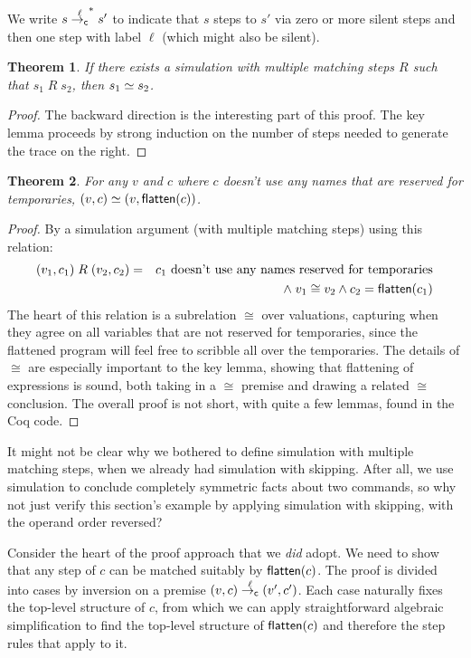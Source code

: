 \documentclass{amsbook}
\newtheorem{theorem}{Theorem}[chapter]
\theoremstyle{definition}
\theoremstyle{remark}
\numberwithin{section}{chapter}
\numberwithin{equation}{chapter}
\begin{document}
We write $s \stackrel{\ell}{\to_\mathsf{c}}^* s'$ to indicate that $s$ steps to $s'$ via zero or more silent steps and then one step with label $\ell$ (which might also be silent).

\begin{theorem}
  If there exists a simulation with multiple matching steps $R$ such that $s_1 \; R \; s_2$, then $s_1 \simeq s_2$.
\end{theorem}
\begin{proof}
  The backward direction is the interesting part of this proof.
  The key lemma proceeds by strong induction on the number of steps needed to generate the trace on the right.
\end{proof}

\begin{theorem}
  For any $v$ and $c$ where $c$ doesn't use any names that are reserved for temporaries, $(v, c) \simeq (v, \mathsf{flatten}(c))$.
\end{theorem}
\begin{proof}
  By a simulation argument (with multiple matching steps) using this relation:
  \begin{eqnarray*}
    (v_1, c_1) \; R \; (v_2, c_2) &=& \textrm{$c_1$ doesn't use any names reserved for temporaries} \\
    && \land \; v_1 \cong v_2 \land c_2 = \mathsf{flatten}(c_1)
  \end{eqnarray*}
  The heart of this relation is a subrelation $\cong$ over valuations, capturing when they agree on all variables that are not reserved for temporaries, since the flattened program will feel free to scribble all over the temporaries.
  The details of $\cong$ are especially important to the key lemma, showing that flattening of expressions is sound, both taking in a $\cong$ premise and drawing a related $\cong$ conclusion.
  The overall proof is not short, with quite a few lemmas, found in the Coq code.
\end{proof}

\medskip

It might not be clear why we bothered to define simulation with multiple matching steps, when we already had simulation with skipping.
After all, we use simulation to conclude completely symmetric facts about two commands, so why not just verify this section's example by applying simulation with skipping, with the operand order reversed?

Consider the heart of the proof approach that we \emph{did} adopt.
We need to show that any step of $c$ can be matched suitably by $\mathsf{flatten}(c)$.
The proof is divided into cases by inversion on a premise $(v, c) \stackrel{\ell}{\to_\mathsf{c}} (v', c')$.
Each case naturally fixes the top-level structure of $c$, from which we can apply straightforward algebraic simplification to find the top-level structure of $\mathsf{flatten}(c)$ and therefore the step rules that apply to it.
\end{document}
